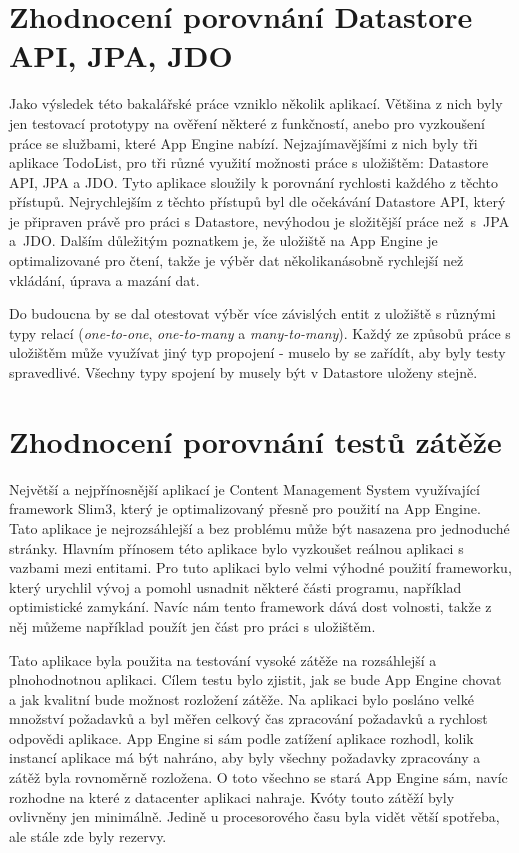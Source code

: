 \section{Zhodnocení porovnání Datastore API, JPA, JDO}
Jako výsledek této bakalářské práce vzniklo několik aplikací. Většina z nich byly jen testovací prototypy na ověření některé z funkčností, anebo pro vyzkoušení práce se službami, které App Engine nabízí. Nejzajímavějšími z nich byly tři aplikace TodoList, pro tři různé využití možnosti práce s uložištěm: Datastore API, JPA a JDO. Tyto aplikace sloužily k porovnání rychlosti každého z těchto přístupů. Nejrychlejším z těchto přístupů byl dle očekávání Datastore API, který je připraven právě pro práci s Datastore, nevýhodou je složitější práce než~s~JPA a~JDO. Dalším důležitým poznatkem je, že uložiště na App Engine je optimalizované pro čtení, takže je výběr dat několikanásobně rychlejší než vkládání, úprava a mazání dat.

Do budoucna by se dal otestovat výběr více závislých entit z uložiště s různými typy relací (\emph{one-to-one}, \emph{one-to-many} a \emph{many-to-many}). Každý ze způsobů práce s uložištěm může využívat jiný typ propojení - muselo by se zařídít, aby byly testy spravedlivé. Všechny typy spojení by musely být v Datastore uloženy stejně.

\section{Zhodnocení porovnání testů zátěže}
Největší a nejpřínosnější aplikací je Content Management System využívající framework Slim3, který je optimalizovaný přesně pro použití na App Engine. Tato aplikace je nejrozsáhlejší a bez problému může být nasazena pro jednoduché stránky. Hlavním přínosem této aplikace bylo vyzkoušet reálnou aplikaci s vazbami mezi entitami. Pro tuto aplikaci bylo velmi výhodné použití frameworku, který urychlil vývoj a pomohl usnadnit některé části programu, například optimistické zamykání. Navíc nám tento framework dává dost volnosti, takže z něj můžeme například použít jen část pro práci s uložištěm. 

Tato aplikace byla použita na testování vysoké zátěže na rozsáhlejší a plnohodnotnou aplikaci. Cílem testu bylo zjistit, jak se bude App Engine chovat a jak kvalitní bude možnost rozložení zátěže. Na aplikaci bylo posláno velké množství požadavků a byl měřen celkový čas zpracování požadavků a rychlost odpovědi aplikace.
App Engine si sám podle zatížení aplikace rozhodl, kolik instancí aplikace má být nahráno, aby byly všechny požadavky zpracovány a zátěž byla rovnoměrně rozložena. O toto všechno se stará App Engine sám, navíc rozhodne na které z datacenter aplikaci nahraje. Kvóty touto zátěží byly ovlivněny jen minimálně. Jedině u procesorového času byla vidět větší spotřeba, ale stále zde byly rezervy. 

